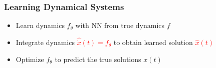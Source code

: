 \documentclass[usenames, dvipsnames, t]{beamer}
\newcommand{\red}[1]{\textcolor{red}{#1}}
\begin{document}
\begin{frame}
	\frametitle{Learning Dynamical Systems}
	\begin{itemize}
		\item<+-> Learn dynamics $f_\theta$ with NN from true dynamics $f$
		\item<+-> Integrate dynamics \red{$ \widehat{\dot{x}}(t) = f_\theta$} to obtain learned solution \red{$\hat{x}(t)$}
		\item<+-> Optimize $f_\theta$ to predict the true solutions $x(t)$
	\end{itemize}
	\onslide<+->
				

		

				


\end{frame}
\end{document}
